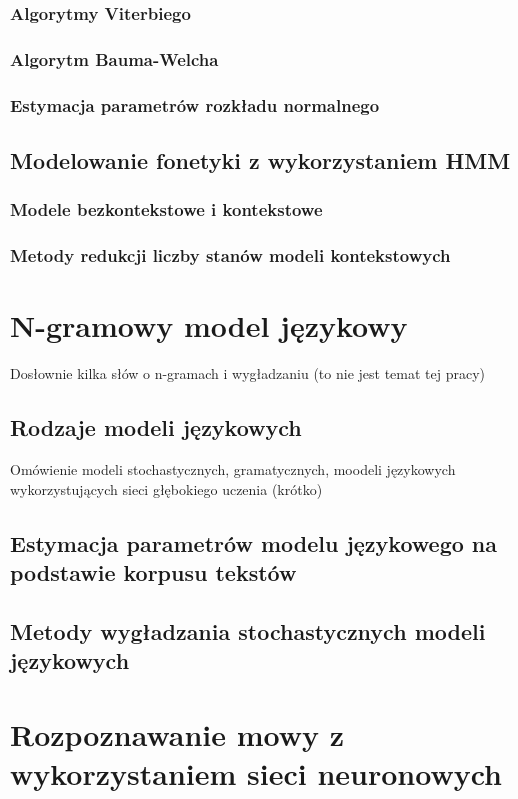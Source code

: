 \documentclass[11pt]{article}
\begin{document}
	   \subsubsection{Algorytmy Viterbiego}
	   \subsubsection{Algorytm Bauma-Welcha}
	   \subsubsection{Estymacja parametrów rozkładu normalnego}
	
    \subsection{Modelowanie fonetyki z wykorzystaniem HMM }
       \subsubsection{ Modele bezkontekstowe i kontekstowe}
       \subsubsection{ Metody redukcji liczby stanów modeli kontekstowych }	

\section{N-gramowy model językowy}
Dosłownie kilka słów o n-gramach i wygładzaniu (to nie jest temat tej pracy)
    \subsection{ Rodzaje modeli językowych }
      Omówienie modeli stochastycznych, gramatycznych, moodeli językowych wykorzystujących sieci głębokiego uczenia (krótko)
    \subsection{ Estymacja parametrów modelu językowego na podstawie korpusu tekstów }
    \subsection{ Metody wygładzania stochastycznych modeli językowych }


\section{Rozpoznawanie mowy z wykorzystaniem sieci neuronowych}
	\label{sec:ASR_NN}
\end{document}
